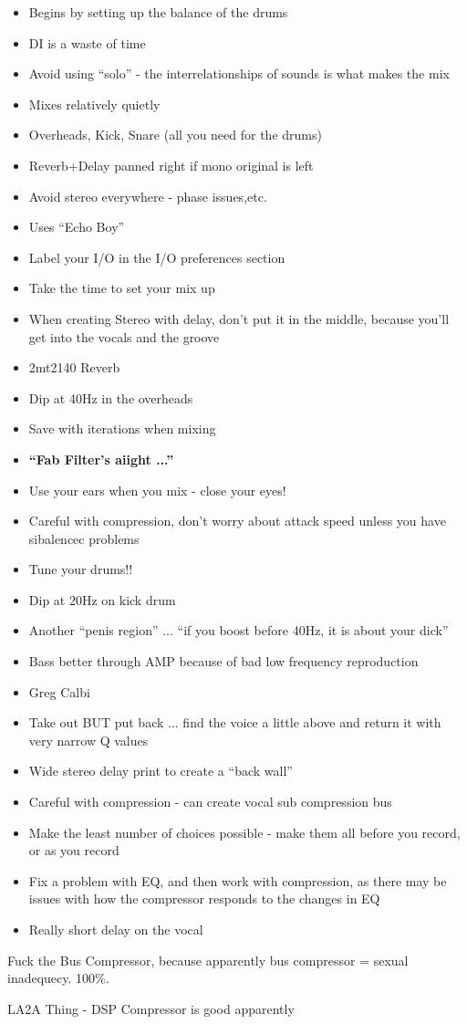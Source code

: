\documentclass{article}
\begin{document}
\begin{itemize}
\item Begins by setting up the balance of the drums
\item DI is a waste of time
\item Avoid using ``solo'' - the interrelationships of sounds is what makes the mix
\item Mixes relatively quietly 
\item Overheads, Kick, Snare (all you need for the drums)
\item Reverb+Delay panned right if mono original is left 
\item Avoid stereo everywhere - phase issues,etc.
\item Uses ``Echo Boy''
\item Label your I/O in the I/O preferences section 
\item Take the time to set your mix up
\item When creating Stereo with delay, don't put it in the middle, because you'll get into the vocals and the groove
\item 2mt2140 Reverb
\item Dip at 40Hz in the overheads 
\item Save with iterations when mixing
\item \textbf{``Fab Filter's aiight ...''}
\item Use your ears when you mix - close your eyes!
\item Careful with compression, don't worry about attack speed unless you have sibalencec problems
\item Tune your drums!!
\item Dip at 20Hz on kick drum 
\item Another ``penis region'' ... ``if you boost before 40Hz, it is about your dick''
\item Bass better through AMP because of bad low frequency reproduction
\item Greg Calbi
\item Take out BUT put back ... find the voice a little above and return it with very narrow Q values
\item Wide stereo delay print to create a ``back wall''
\item Careful with compression - can create vocal sub compression bus
\item Make the least number of choices possible - make them all before you record, or as you record
\item Fix a problem with EQ, and then work with compression, as there may be issues with how the compressor responds to the changes in EQ
\item Really short delay on the vocal
\end{itemize}

\medskip

Fuck the Bus Compressor, because apparently bus compressor = sexual inadequecy. 100\%.

\medskip

LA2A Thing - DSP Compressor is good apparently
\end{document}
